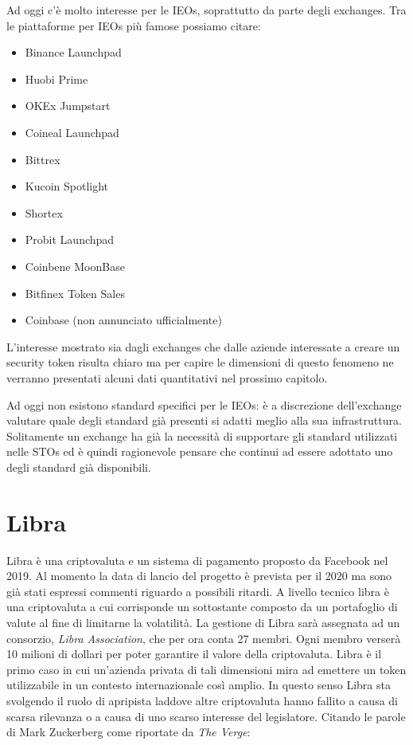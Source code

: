 Ad oggi c'è molto interesse per le IEOs, soprattutto da parte degli exchanges. Tra le piattaforme per IEOs più famose possiamo citare:
\begin{itemize}
    \item Binance Launchpad
    \item Huobi Prime
    \item OKEx Jumpstart
    \item Coineal Launchpad 
    \item Bittrex
    \item Kucoin Spotlight
    \item Shortex 
    \item Probit Launchpad 
    \item Coinbene MoonBase
    \item Bitfinex Token Sales
    \item Coinbase (non annunciato ufficialmente) 
\end{itemize}
L'interesse mostrato sia dagli exchanges che dalle aziende interessate a creare un security token risulta chiaro ma per capire le dimensioni di questo fenomeno ne verranno presentati alcuni dati quantitativi nel prossimo capitolo.

Ad oggi non esistono standard specifici per le IEOs: è a discrezione dell'exchange valutare quale degli standard già presenti si adatti meglio alla sua infrastruttura. Solitamente un exchange ha già la necessità di supportare gli standard utilizzati nelle STOs ed è quindi ragionevole pensare che continui ad essere adottato uno degli standard già disponibili. 

\section{Libra}
Libra è una criptovaluta e un sistema di pagamento proposto da Facebook nel 2019. Al momento la data di lancio del progetto è prevista per il 2020 ma sono già stati espressi commenti riguardo a possibili ritardi. 
A livello tecnico libra è una criptovaluta a cui corrisponde un sottostante composto da un portafoglio di valute al fine di limitarne la volatilità. La gestione di Libra sarà assegnata ad un consorzio, \textit{Libra Association}, che per ora conta 27 membri. Ogni membro verserà 10 milioni di dollari per poter garantire il valore della criptovaluta. 
Libra è il primo caso in cui un'azienda privata di tali dimensioni mira ad emettere un token utilizzabile in un contesto internazionale così amplio. In questo senso Libra sta svolgendo il ruolo di apripista laddove altre criptovaluta hanno fallito a causa di scarsa rilevanza o a causa di uno scarso interesse del legislatore. Citando le parole di Mark Zuckerberg come riportate da \textit{The Verge}: 

